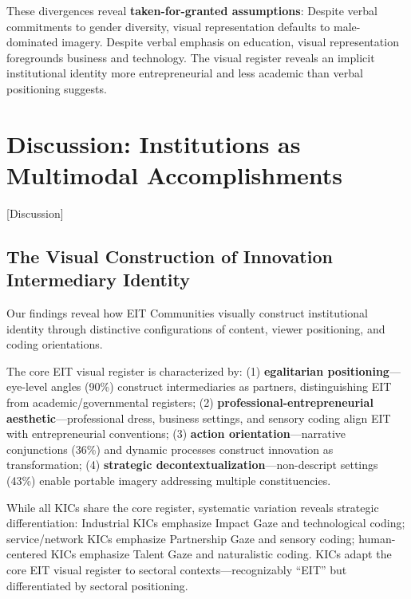 \documentclass[../main.tex]{subfiles}
\begin{document}
These divergences reveal \textbf{taken-for-granted assumptions}: Despite verbal commitments to gender diversity, visual representation defaults to male-dominated imagery. Despite verbal emphasis on education, visual representation foregrounds business and technology. The visual register reveals an implicit institutional identity more entrepreneurial and less academic than verbal positioning suggests.

\section{Discussion: Institutions as Multimodal Accomplishments}[Discussion]

\subsection{The Visual Construction of Innovation Intermediary Identity}

Our findings reveal how EIT Communities visually construct institutional identity through distinctive configurations of content, viewer positioning, and coding orientations.

The core EIT visual register is characterized by: (1) \textbf{egalitarian positioning}---eye-level angles (90\%) construct intermediaries as partners, distinguishing EIT from academic/governmental registers; (2) \textbf{professional-entrepreneurial aesthetic}---professional dress, business settings, and sensory coding align EIT with entrepreneurial conventions; (3) \textbf{action orientation}---narrative conjunctions (36\%) and dynamic processes construct innovation as transformation; (4) \textbf{strategic decontextualization}---non-descript settings (43\%) enable portable imagery addressing multiple constituencies.

While all KICs share the core register, systematic variation reveals strategic differentiation: Industrial KICs emphasize Impact Gaze and technological coding; service/network KICs emphasize Partnership Gaze and sensory coding; human-centered KICs emphasize Talent Gaze and naturalistic coding. KICs adapt the core EIT visual register to sectoral contexts---recognizably ``EIT'' but differentiated by sectoral positioning.
\end{document}

